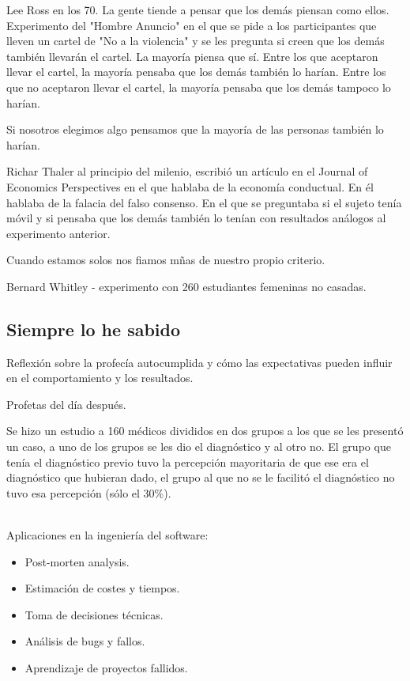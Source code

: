 \documentclass[12pt, a4paper, twoside]{article}
\begin{document}
Lee Ross en los 70. La gente tiende a pensar que los demás piensan como ellos.
Experimento del "Hombre Anuncio" en el que se pide a los participantes que lleven un cartel de "No a la violencia" y se les pregunta si creen que los demás también llevarán el cartel. La mayoría piensa que sí.
Entre los que aceptaron llevar el cartel, la mayoría pensaba que los demás también lo harían.
Entre los que no aceptaron llevar el cartel, la mayoría pensaba que los demás tampoco lo harían.

Si nosotros elegimos algo pensamos que la mayoría de las personas también lo harían.

Richar Thaler al principio del milenio, escribió un artículo en el Journal of Economics Perspectives en el que hablaba de la economía conductual. En él hablaba de la falacia del falso consenso.
En el que se preguntaba si el sujeto tenía móvil y si pensaba que los demás también lo tenían con resultados análogos al experimento anterior.  

Cuando estamos solos nos fiamos mñas de nuestro propio criterio.

Bernard Whitley - experimento con 260 estudiantes femeninas no casadas.



\subsection{Siempre lo he sabido}

Reflexión sobre la profecía autocumplida y cómo las expectativas pueden influir en el comportamiento y los resultados.


Profetas del día después.

Se hizo un estudio a 160 médicos divididos en dos grupos a los que se les presentó un caso, a uno de los grupos se les dio el diagnóstico
y al otro no. El grupo que tenía el diagnóstico previo tuvo la percepción mayoritaria de que ese era el diagnóstico que hubieran dado, el grupo 
al que no se le facilitó el diagnóstico no tuvo esa percepción (sólo el 30\%).
\\\

Aplicaciones en la ingeniería del software:
\begin{itemize}
    \item Post-morten analysis.
    \item Estimación de costes y tiempos.
    \item Toma de decisiones técnicas.
    \item Análisis de bugs y fallos.
    \item Aprendizaje de proyectos fallidos.
\end{itemize}
\end{document}
